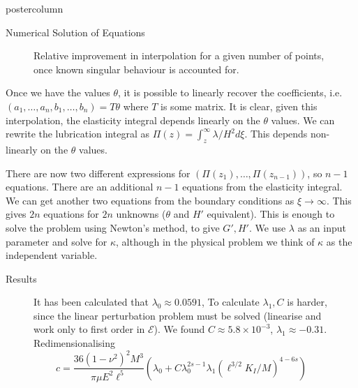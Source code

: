 \documentclass{beamer}
\newcommand{\cE}{\mathcal{E}}                               %
\begin{document}
\begin{frame}
\begin{columns}
\begin{column}{.57\textwidth}
\begin{beamercolorbox}[center]{postercolumn}
\begin{minipage}{.98\textwidth}
{\begin{myblock}{Numerical Solution of Equations}
\begin{figure}
\begin{minipage}{0.9\textwidth}
\caption{Relative improvement in interpolation for a given number of points,
once known singular behaviour is accounted for.}
\end{minipage}
\end{figure}
Once we have the values $\theta$, it is possible to linearly recover
the coefficients, i.e. $(a_1,\dots, a_n,b_1,\dots , b_n) = T \theta$ where
$T$ is some matrix. It is clear, given this interpolation, the elasticity
integral depends linearly on the $\theta$ values.
We can rewrite the lubrication integral as  
$\Pi(z) = \int_{z}^{\infty} \lambda/H^2 d\xi$. This depends non-linearly
on the $\theta$ values. 

There are now two different expressions for $(\Pi(z_1) , \dots , \Pi(z_{n-1}))$,
so $n-1$ equations. There
are an additional $n-1$ equations from the elasticity integral. We can get
another two equations from the boundary conditions as $\xi\to\infty$.
This gives $2n$ equations for $2n$ unknowns ($\theta$ and $H'$ equivalent).
This is enough to solve the problem using Newton's method, to give $G',H'$.
We use $\lambda$ as an input parameter and solve for $\kappa$, although in
the physical problem we think of $\kappa$ as the independent variable.
\end{myblock}\vfill
\begin{myblock}{Results}
\begin{figure}
\begin{minipage}{0.55\textwidth}
It has been calculated that $\lambda_0 \approx 0.0591$,
To calculate $\lambda_1,C$ is harder, since the linear perturbation problem
must be solved (linearise and  work only to first order in $\cE$). We found
$C \approx 5.8 \times 10^{-3}$, $\lambda_1 \approx -0.31$. Redimensionalising
\[ c = \frac{36(1-\nu^2)^2M^3}{\pi \mu E^2 \ell^5}\left(\lambda_0 + C 
\lambda_0^{2s-1}\lambda_1 (\ell^{3/2}K_I/M)^{4-6s} \right) \]


\end{minipage}
\end{figure}
\end{myblock}}
\end{minipage}
\end{beamercolorbox}
\end{column}
\end{columns}
\end{frame}
\end{document}
